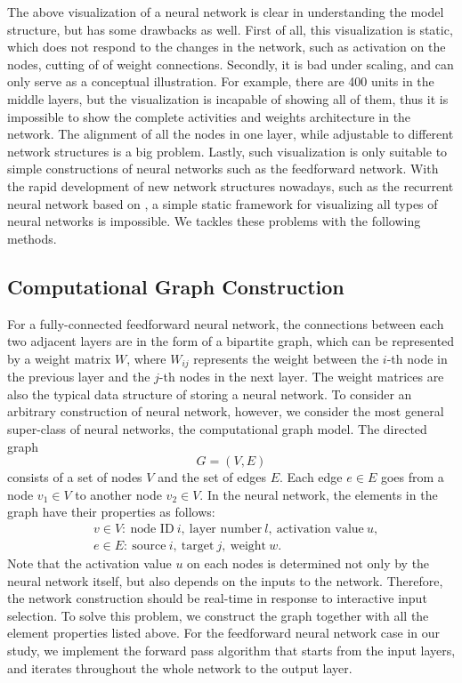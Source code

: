 \documentclass[sigchi]{acmart}
\begin{document}
The above visualization of a neural network is clear in understanding the model structure, but has some drawbacks as well. First of all, this visualization is static, which does not respond to the changes in the network, such as activation on the nodes, cutting of of weight connections. Secondly, it is bad under scaling, and can only serve as a conceptual illustration. For example, there are 400 units in the middle layers, but the visualization is incapable of showing all of them, thus it is impossible to show the complete activities and weights architecture in the network. The alignment of all the nodes in one layer, while adjustable to different network structures is a big problem. Lastly, such visualization is only suitable to simple constructions of neural networks such as the feedforward network. With the rapid development of new network structures nowadays, such as the recurrent neural network based on \cite{rumelhart1988learning}, a simple static framework for visualizing all types of neural networks is impossible. We tackles these problems with the following methods.

\subsection{Computational Graph Construction}
For a fully-connected feedforward neural network, the connections between each two adjacent layers are in the form of a bipartite graph, which can be represented by a weight matrix $W$, where $W_{ij}$ represents the weight between the $i$-th node in the previous layer and the $j$-th nodes in the next layer. The weight matrices are also the typical data structure of storing a neural network. To consider an arbitrary construction of neural network, however, we consider the most general super-class of neural networks, the computational graph model. The directed graph 
\[
G = (V, E)
\]
consists of a set of nodes $V$ and the set of edges $E$. Each edge $e \in E$ goes from a node $v_1 \in V$ to another node $v_2 \in V$. In the neural network, the elements in the graph have their properties as follows:
\begin{align*}
& v \in V: \ \mbox{node ID}\ i, \ \mbox{layer number}\ l, \ \mbox{activation value}\ u, \\
& e \in E: \ \mbox{source}\ i, \ \mbox{target}\ j, \ \mbox{weight}\ w.
\end{align*}
Note that the activation value $u$ on each nodes is determined not only by the neural network itself, but also depends on the inputs to the network. Therefore, the network construction should be real-time in response to interactive input selection. To solve this problem, we construct the graph together with all  the element properties listed above. For the feedforward neural network case in our study, we implement the forward pass algorithm that starts from the input layers, and iterates throughout the whole network to the output layer. 
\end{document}
